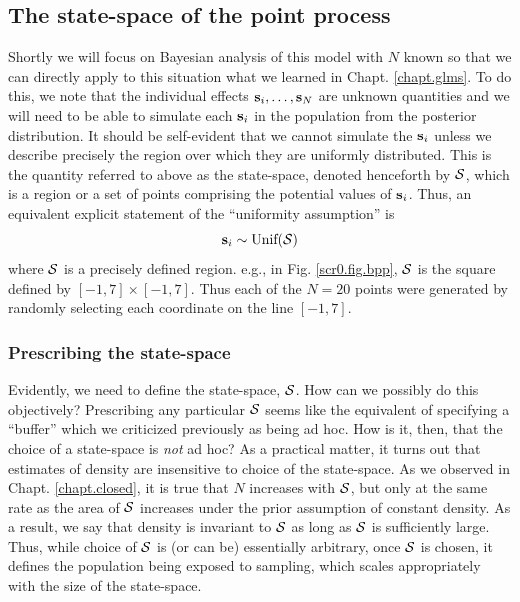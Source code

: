 \subsection{The state-space of the point process}

Shortly we will focus on Bayesian analysis of this model with $N$
known so that we can directly apply to this situation what we learned
in Chapt. \ref{chapt.glms}. To do this, we note that the individual
effects ${\bf s}_{i},\ldots, {\bf s}_{N}$ are unknown quantities and
we will need to be able to simulate each ${\bf s}_{i}$ in the
population from the posterior distribution.  It should be self-evident
that we cannot simulate the ${\bf s}_{i}$ unless we describe precisely
the region over which they are uniformly distributed. This is the
quantity referred to above as the state-space, denoted henceforth by
${\cal S}$, which is a region or a set of points comprising the
potential values of ${\bf s}_{i}$. Thus, an equivalent explicit
statement of the ``uniformity assumption'' is
\[
{\bf s}_{i} \sim \mbox{Unif}({\cal S})
\]
where ${\cal S}$ is a precisely defined region. e.g., in Fig. 
\ref{scr0.fig.bpp}, ${\cal S}$ is the square defined by $[-1,7] \times
[-1, 7]$. Thus each of the $N=20$ points were generated by randomly
selecting each coordinate on the line $[-1, 7]$. 


\subsubsection{Prescribing the state-space}

Evidently, we need to define the state-space, ${\cal S}$. How can we
possibly do this objectively? Prescribing any particular ${\cal S}$
seems like the equivalent of specifying a ``buffer'' which we
criticized previously as being ad hoc. How is it, then, that the choice of a
state-space is {\it not} ad hoc? As a practical matter, it turns out
that estimates of density are insensitive to choice of the
state-space. As we observed in Chapt. \ref{chapt.closed}, it is true that $N$ increases
with ${\cal S}$, but only at the same rate as the area of ${\cal S}$
increases under the
prior assumption of constant density. As a result, we say that density
is invariant to ${\cal S}$ as long as ${\cal S}$ is sufficiently
large. Thus, while choice of ${\cal S}$ is (or can be) essentially
arbitrary, once ${\cal S}$ is chosen, it defines the population being
exposed to sampling, which scales appropriately with the size of the
state-space.

